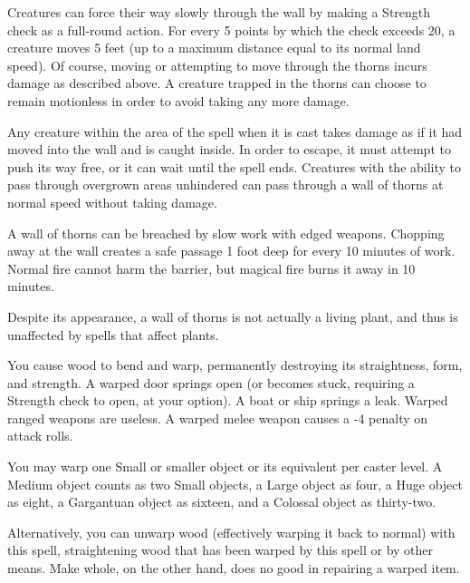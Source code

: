 \begin{multicols}{2}
\begin{small}
\smallskip\noindent Creatures can force their way slowly through the wall by making a Strength check as a full-round action. For every 5 points by which the check exceeds 20, a creature moves 5 feet (up to a maximum distance equal to its normal land speed). Of course, moving or attempting to move through the thorns incurs damage as described above. A creature trapped in the thorns can choose to remain motionless in order to avoid taking any more damage.

\smallskip\noindent Any creature within the area of the spell when it is cast takes damage as if it had moved into the wall and is caught inside. In order to escape, it must attempt to push its way free, or it can wait until the spell ends. Creatures with the ability to pass through overgrown areas unhindered can pass through a wall of thorns at normal speed without taking damage.

\smallskip\noindent A wall of thorns can be breached by slow work with edged weapons. Chopping away at the wall creates a safe passage 1 foot deep for every 10 minutes of work. Normal fire cannot harm the barrier, but magical fire burns it away in 10 minutes.

\smallskip\noindent Despite its appearance, a wall of thorns is not actually a living plant, and thus is unaffected by spells that affect plants.

\noindent You cause wood to bend and warp, permanently destroying its straightness, form, and strength. A warped door springs open (or becomes stuck, requiring a Strength check to open, at your option). A boat or ship springs a leak. Warped ranged weapons are useless. A warped melee weapon causes a -4 penalty on attack rolls.

\smallskip\noindent You may warp one Small or smaller object or its equivalent per caster level. A Medium object counts as two Small objects, a Large object as four, a Huge object as eight, a Gargantuan object as sixteen, and a Colossal object as thirty-two.

\smallskip\noindent Alternatively, you can unwarp wood (effectively warping it back to normal) with this spell, straightening wood that has been warped by this spell or by other means. Make whole, on the other hand, does no good in repairing a warped item.


\end{small}
\end{multicols}
